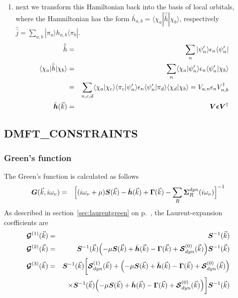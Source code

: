 \documentclass[11pt,a4paper]{report}
\begin{document}
\begin{enumerate}
%
\item next we transform this Hamiltonian back into the basis of local
  orbitals, where the Hamniltonian has the form
  $\bar{h}_{a,b}=\langle\chi_a|\hat{\bar{h}}|\chi_b\rangle$,
  respectively $\hat{\bar{j}}=\sum_{a,b}|\pi_a\rangle
  h_{a,b}\langle\pi_b|$.
  \begin{eqnarray}
    \hat{\bar{h}}&=&\sum_n|\psi'_n\rangle\epsilon_n\langle\psi'_n|
  \nonumber\\
    \langle\chi_a|\hat{\bar{h}}|\chi_b\rangle&=&
    \sum_n\langle\chi_a|\psi'_n\rangle\epsilon_n\langle\psi'_n|\chi_b\rangle
   \nonumber\\
    &=&
    \sum_{n,c,d}\langle\chi_a|\chi_c\rangle\langle\pi_c|\psi'_n\rangle\epsilon_n
     \langle\psi'_n|\pi_d\rangle\langle\chi_d|\chi_b\rangle
    =V_{a,n}\epsilon_n V^\dagger_{n,b}
   \nonumber\\
     \bar{\bm{h}}(\vec{k})&=&
       \bm{V}\bm{\epsilon}\bm{V}^\dagger
   \end{eqnarray}
\end{enumerate}

\subsection{DMFT\_CONSTRAINTS}
\label{sec:routinedmftconstraints}
\subsubsection{Green's function}
The Green's function is calculated as follows
\begin{eqnarray}
\bm{G}(\vec{k},i\omega_\nu)&=&
\Bigl[
(i\omega_\nu+\mu)\bm{S}(\vec{k})-\bar{\bm{h}}(\vec{k})+\bm{\Gamma}(\vec{k})
-\sum_R\bm{\Sigma}^{dyn}_R(i\omega_\nu)
\Bigr]^{-1}
\end{eqnarray}
As described in section~\ref{sec:laurentgreen} on
p.~\pageref{sec:laurentgreen}, the Laurent-expansion coefficients are
\begin{eqnarray}
\mat{\mathcal{G}}^{(1)}(\vec{k})&=&\mat{S}^{-1}(\vec{k})
%
\nonumber\\
\mat{\mathcal{G}}^{(2)}(\vec{k})&=&\mat{S}^{-1}(\vec{k})
\Bigl(-\mu\mat{S}(\vec{k})+\bar{\mat{h}}(\vec{k})-\mat{\Gamma}(\vec{k})
+\mat{\mathcal{S}}^{(0)}_{dyn}(\vec{k})
\Bigr)
\mat{S}^{-1}(\vec{k})
%
\nonumber\\
\mat{\mathcal{G}}^{(3)}(\vec{k})&=&
\mat{S}^{-1}(\vec{k})
\biggl[
\mat{\mathcal{S}}^{(1)}_{dyn}(\vec{k})+
\Bigl(-\mu\mat{S}(\vec{k})+\bar{\mat{h}}(\vec{k})-\mat{\Gamma}(\vec{k})
+\mat{\mathcal{S}}^{(0)}_{dyn}(\vec{k})\Bigr)
\nonumber\\
&&\times\mat{S}^{-1}(\vec{k})
\Bigl(-\mu\mat{S}(\vec{k})+\bar{\mat{h}}(\vec{k})-\mat{\Gamma}(\vec{k})
+\mat{\mathcal{S}}^{(0)}_{dyn}(\vec{k})\Bigr)
\biggr]
\mat{S}^{-1}(\vec{k})
\nonumber\\
\end{eqnarray}
%
\end{document}
